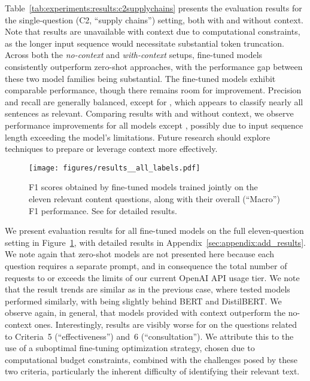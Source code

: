 Table~\ref{tab:experiments:results:c2supplychains} presents the evaluation results for the single-question (C2, ``supply chains'') setting, both with and without context. Note that \llama{} results are unavailable with context due to computational constraints, as the longer input sequence would necessitate substantial token truncation. Across both the \emph{no-context} and \emph{with-context} setups, fine-tuned models consistently outperform zero-shot approaches, with the performance gap between these two model families being substantial.
The fine-tuned models exhibit comparable performance, though there remains room for improvement. Precision and recall are generally balanced, except for \gptthree{}, which appears to classify nearly all sentences as relevant. Comparing results with and without context, we observe performance improvements for all models except \gptthree{}, possibly due to input sequence length exceeding the model's limitations. Future research should explore techniques to prepare or leverage context more effectively.
\begin{figure}[t]
\begin{center}
\vspace{2mm}
\texttt{[image: figures/results\_\_all\_labels.pdf]}
\caption{F1 scores obtained by fine-tuned models trained jointly on the eleven relevant content questions, along with their overall (``Macro'') F1 performance. See \appendixAddResults{} for detailed results.}
\label{fig:experiments:results:all}
\end{center}
\end{figure}
We present evaluation results for all fine-tuned models on the full eleven-question setting in Figure~\ref{fig:experiments:results:all}, with detailed results in Appendix~\ref{sec:appendix:add_results}. We note again that zero-shot models are not presented here because each question requires a separate prompt, and in consequence the total number of requests to \gptthree{} or \gptfour{} exceeds the limits of our current OpenAI API usage tier. We note that the result trends are similar as in the previous \ctwo{} case, where tested models performed similarly, with \llama{} being slightly behind BERT and DistilBERT. We observe again, in general, that models provided with context outperform the no-context ones. Interestingly, results are visibly worse for \llama{} on the questions related to Criteria~5 (``effectiveness'') and~6 (``consultation''). We attribute this to the use of a suboptimal fine-tuning optimization strategy, chosen due to computational budget constraints, combined with the challenges posed by these two criteria, particularly the inherent difficulty of identifying their relevant text.



